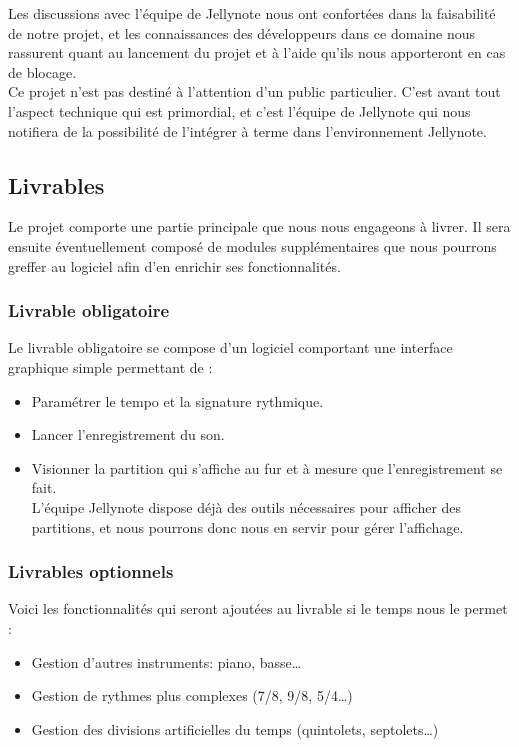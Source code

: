 \documentclass[12pt]{article}
\begin{document}
Les discussions avec l’équipe de Jellynote nous ont confortées dans la faisabilité de notre projet, et les connaissances des développeurs dans ce domaine nous rassurent quant au lancement du projet et à l’aide qu’ils nous apporteront en cas de blocage.\\


Ce projet n’est pas destiné à l’attention d’un public particulier. C’est avant tout l’aspect technique qui est primordial, et c’est l’équipe de Jellynote qui nous notifiera de la possibilité de l’intégrer à terme dans l’environnement Jellynote.\\

\newpage
\subsection{Livrables}
Le projet comporte une partie principale que nous nous engageons à livrer. Il sera ensuite éventuellement composé de modules supplémentaires que nous pourrons greffer au logiciel afin d’en enrichir ses fonctionnalités.\\

\subsubsection{Livrable obligatoire}

Le livrable obligatoire se compose d’un logiciel comportant une interface graphique simple permettant de :\\
\begin{itemize}
\item Paramétrer le tempo et la signature rythmique.
\item Lancer l'enregistrement du son.
\item Visionner la partition qui s'affiche au fur et à mesure que l'enregistrement se fait.\\
L’équipe Jellynote dispose déjà des outils nécessaires pour afficher des partitions, et nous pourrons donc nous en servir pour gérer l'affichage.
\end{itemize}

\subsubsection{Livrables optionnels}

Voici les fonctionnalités qui seront ajoutées au livrable si le temps nous le permet :
\begin{itemize}
\item Gestion d’autres instruments: piano, basse…
\item Gestion de rythmes plus complexes (7/8, 9/8, 5/4…)
\item Gestion des divisions artificielles du temps (quintolets, septolets…)
\end{itemize}
\end{document}
